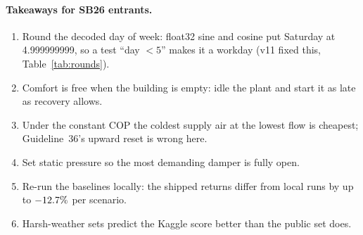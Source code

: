 \documentclass{article}
\begin{document}
\paragraph{Takeaways for SB26 entrants.}
\begin{enumerate}
\item Round the decoded day of week: float32 sine and cosine put Saturday at 4.999999999, so a test ``day $<5$'' makes it a workday (v11 fixed this, Table~\ref{tab:rounds}).
\item Comfort is free when the building is empty: idle the plant and start it as late as recovery allows.
\item Under the constant COP the coldest supply air at the lowest flow is cheapest; Guideline~36's upward reset is wrong here.
\item Set static pressure so the most demanding damper is fully open.
\item Re-run the baselines locally: the shipped returns differ from local runs by up to $-12.7\%$ per scenario.
\item Harsh-weather sets predict the Kaggle score better than the public set does.
\end{enumerate}
\end{document}
